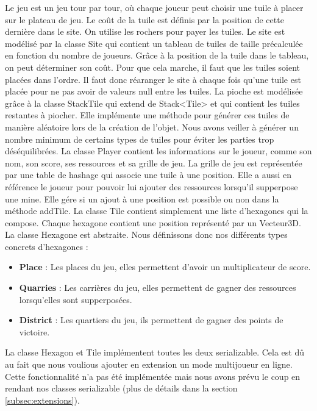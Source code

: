 \documentclass{article}
\begin{document}
    Le jeu est un jeu tour par tour, où chaque joueur peut choisir une tuile à placer sur le plateau de jeu.
    Le coût de la tuile est définis par la position de cette dernière dans le site.
    On utilise les rochers pour payer les tuiles.
    Le site est modélisé par la classe Site qui contient un tableau de tuiles de taille précalculée en fonction du nombre de joueurs.
    Grâce à la position de la tuile dans le tableau, on peut déterminer son coût. Pour que cela marche, il faut que les tuiles soient placées dans l'ordre.
    Il faut donc réaranger le site à chaque fois qu'une tuile est placée pour ne pas avoir de valeurs null entre les tuiles.
    La pioche est modélisée grâce à la classe StackTile qui extend de Stack\textless{}Tile\textgreater{} et qui contient les tuiles restantes à piocher.
    Elle implémente une méthode pour générer ces tuiles de manière aléatoire lors de la création de l'objet.
    Nous avons veiller à générer un nombre minimum de certains types de tuiles pour éviter les parties trop déséquilibrées.
    La classe Player contient les informations sur le joueur, comme son nom, son score, ses ressources et sa grille de jeu.
    La grille de jeu est représentée par une table de hashage qui associe une tuile à une position.
    Elle a aussi en référence le joueur pour pouvoir lui ajouter des ressources lorsqu'il supperpose une mine.
    Elle gére si un ajout à une position est possible ou non dans la méthode addTile.
    La classe Tile contient simplement une liste d'hexagones qui la compose.
    Chaque hexagone contient une position représenté par un Vecteur3D. La classe Hexagone est abstraite. 
    Nous définissons donc nos différents types concrets d'hexagones :
    \begin{itemize}
        \item \textbf{Place} : Les places du jeu, elles permettent d'avoir un multiplicateur de score.
        \item \textbf{Quarries} : Les carrières du jeu, elles permettent de gagner des ressources lorsqu'elles sont supperposées.
        \item \textbf{District} : Les quartiers du jeu, ils permettent de gagner des points de victoire.
    \end{itemize}
    La classe Hexagon et Tile implémentent toutes les deux serializable. Cela est dû au fait que nous voulious ajouter en extension un mode multijoueur en ligne.
    Cette fonctionnalité n'a pas été implémentée mais nous avons prévu le coup en rendant nos classes serializable (plus de détails dans la section \ref{subsec:extensions}).
\end{document}
